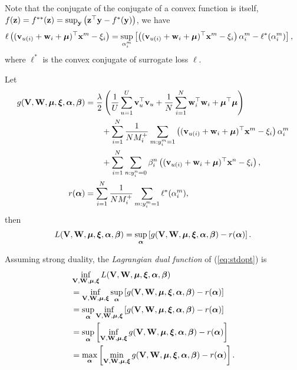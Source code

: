 Note that the conjugate of the conjugate of a convex function is itself, \ie $f(\mathbf{z}) = f^{**}(\mathbf{z}) = \sup_{\mathbf{y}} \left(\mathbf{z}^\top \mathbf{y} - f^*(\mathbf{y}) \right)$, we have
\begin{equation*}
\begin{aligned}
\ell \left( (\mathbf{v}_{u(i)} + \mathbf{w}_i + \bm{\mu})^\top \mathbf{x}^m - \xi_i \right)
&= \sup_{\alpha_i^m} \left[ \left( (\mathbf{v}_{u(i)} + \mathbf{w}_i + \bm{\mu})^\top \mathbf{x}^m - \xi_i \right) \alpha_i^m - \ell^*(\alpha_i^m) \right],
\end{aligned}
\end{equation*}
where $\ell^*$ is the convex conjugate of surrogate loss $\ell$.

Let
\begin{equation*}
\begin{aligned}
g(\mathbf{V}, \mathbf{W}, \bm{\mu}, \bm{\xi}, {\bm{\alpha}}, {\bm{\beta}})
&= \frac{\lambda}{2} \left( \frac{1}{U} \sum_{u=1}^U \mathbf{v}_u^\top \mathbf{v}_u 
     + \frac{1}{N} \sum_{i=1}^N \mathbf{w}_i^\top \mathbf{w}_i + \bm{\mu}^\top \bm{\mu} \right) \\
& \hspace{2em}
     + \sum_{i=1}^N \frac{1}{N M_i^+} \sum_{m: y_i^m = 1} \left( (\mathbf{v}_{u(i)} + \mathbf{w}_i + \bm{\mu})^\top \mathbf{x}^m - \xi_i \right) \alpha_i^m \\
& \hspace{2em}
     + \sum_{i=1}^N \sum_{n: y_i^n = 0} \beta_i^n \left( (\mathbf{v}_{u(i)} + \mathbf{w}_i + \bm{\mu})^\top \mathbf{x}^n - \xi_i \right), \\
r({\bm{\alpha}})
&= \sum_{i=1}^N \frac{1}{N M_i^+} \sum_{m: y_i^m = 1} \ell^*(\alpha_i^m),
\end{aligned}
\end{equation*}
then 
\begin{equation*}
\begin{aligned}
L(\mathbf{V}, \mathbf{W}, \bm{\mu}, \bm{\xi}, {\bm{\alpha}}, {\bm{\beta}}) 
= \sup_{\bm{\alpha}} \left[ g(\mathbf{V}, \mathbf{W}, \bm{\mu}, \bm{\xi}, {\bm{\alpha}}, {\bm{\beta}}) - r({\bm{\alpha}}) \right].
\end{aligned}
\end{equation*}

Assuming strong duality, the \emph{Lagrangian dual function} of (\ref{eq:stdopt}) is
\begin{equation*}
\begin{aligned}
&\inf_{\mathbf{V}, \mathbf{W}, \bm{\mu}, \bm{\xi}} L(\mathbf{V}, \mathbf{W}, \bm{\mu}, \bm{\xi}, {\bm{\alpha}}, {\bm{\beta}}) \\
&= \inf_{\mathbf{V}, \mathbf{W}, \bm{\mu}, \bm{\xi}} \sup_{\bm{\alpha}} \left[ g(\mathbf{V}, \mathbf{W}, \bm{\mu}, \bm{\xi}, {\bm{\alpha}}, {\bm{\beta}}) - r({\bm{\alpha}}) \right] \\
&= \sup_{\bm{\alpha}} \inf_{\mathbf{V}, \mathbf{W}, \bm{\mu}, \bm{\xi}} \left[ g(\mathbf{V}, \mathbf{W}, \bm{\mu}, \bm{\xi}, {\bm{\alpha}}, {\bm{\beta}}) - r({\bm{\alpha}}) \right] \\
&= \sup_{\bm{\alpha}} \left[ \inf_{\mathbf{V}, \mathbf{W}, \bm{\mu}, \bm{\xi}} g(\mathbf{V}, \mathbf{W}, \bm{\mu}, \bm{\xi}, {\bm{\alpha}}, {\bm{\beta}}) - r({\bm{\alpha}}) \right] \\
&= \max_{\bm{\alpha}} \left[ \min_{\mathbf{V}, \mathbf{W}, \bm{\mu}, \bm{\xi}} g(\mathbf{V}, \mathbf{W}, \bm{\mu}, \bm{\xi}, {\bm{\alpha}}, {\bm{\beta}}) - r({\bm{\alpha}}) \right].
\end{aligned}
\end{equation*}

